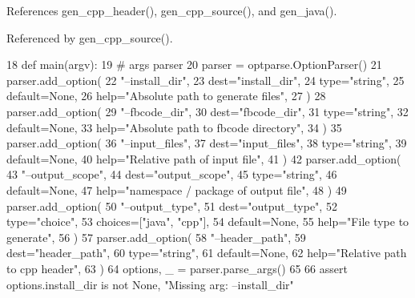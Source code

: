 References gen\+\_\+cpp\+\_\+header(), gen\+\_\+cpp\+\_\+source(), and gen\+\_\+java().



Referenced by gen\+\_\+cpp\+\_\+source().


\begin{DoxyCode}
18 \textcolor{keyword}{def }main(argv):
19     \textcolor{comment}{# args parser}
20     parser = optparse.OptionParser()
21     parser.add\_option(
22         \textcolor{stringliteral}{"--install\_dir"},
23         dest=\textcolor{stringliteral}{"install\_dir"},
24         type=\textcolor{stringliteral}{"string"},
25         default=\textcolor{keywordtype}{None},
26         help=\textcolor{stringliteral}{"Absolute path to generate files"},
27     )
28     parser.add\_option(
29         \textcolor{stringliteral}{"--fbcode\_dir"},
30         dest=\textcolor{stringliteral}{"fbcode\_dir"},
31         type=\textcolor{stringliteral}{"string"},
32         default=\textcolor{keywordtype}{None},
33         help=\textcolor{stringliteral}{"Absolute path to fbcode directory"},
34     )
35     parser.add\_option(
36         \textcolor{stringliteral}{"--input\_files"},
37         dest=\textcolor{stringliteral}{"input\_files"},
38         type=\textcolor{stringliteral}{"string"},
39         default=\textcolor{keywordtype}{None},
40         help=\textcolor{stringliteral}{"Relative path of input file"},
41     )
42     parser.add\_option(
43         \textcolor{stringliteral}{"--output\_scope"},
44         dest=\textcolor{stringliteral}{"output\_scope"},
45         type=\textcolor{stringliteral}{"string"},
46         default=\textcolor{keywordtype}{None},
47         help=\textcolor{stringliteral}{"namespace / package of output file"},
48     )
49     parser.add\_option(
50         \textcolor{stringliteral}{"--output\_type"},
51         dest=\textcolor{stringliteral}{"output\_type"},
52         type=\textcolor{stringliteral}{"choice"},
53         choices=[\textcolor{stringliteral}{"java"}, \textcolor{stringliteral}{"cpp"}],
54         default=\textcolor{keywordtype}{None},
55         help=\textcolor{stringliteral}{"File type to generate"},
56     )
57     parser.add\_option(
58         \textcolor{stringliteral}{"--header\_path"},
59         dest=\textcolor{stringliteral}{"header\_path"},
60         type=\textcolor{stringliteral}{"string"},
61         default=\textcolor{keywordtype}{None},
62         help=\textcolor{stringliteral}{"Relative path to cpp header"},
63     )
64     options, \_ = parser.parse\_args()
65 
66     \textcolor{keyword}{assert} options.install\_dir \textcolor{keywordflow}{is} \textcolor{keywordflow}{not} \textcolor{keywordtype}{None}, \textcolor{stringliteral}{"Missing arg: --install\_dir"}

\end{DoxyCode}
